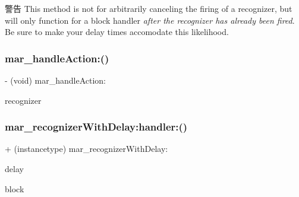 \begin{DoxyWarning}{警告}
This method is not for arbitrarily canceling the firing of a recognizer, but will only function for a block handler {\itshape after the recognizer has already been fired}. Be sure to make your delay times accomodate this likelihood. 
\end{DoxyWarning}
\mbox{\label{category_u_i_gesture_recognizer_07_m_a_r_e_x___block_08_a0b2b9fe2666c4e42cfc2ae11e7ce2221}} 
\subsubsection{\texorpdfstring{mar\+\_\+handle\+Action\+:()}{mar\_handleAction:()}}
{\footnotesize\ttfamily -\/ (void) mar\+\_\+handle\+Action\+: \begin{DoxyParamCaption}\item[{(U\+I\+Gesture\+Recognizer $\ast$)}]{recognizer }\end{DoxyParamCaption}\hspace{0.3cm}{\ttfamily [implementation]}}

\mbox{\label{category_u_i_gesture_recognizer_07_m_a_r_e_x___block_08_a5e3253cef9d5a3acd1f74cc96b421e50}} 
\subsubsection{\texorpdfstring{mar\+\_\+recognizer\+With\+Delay\+:handler\+:()}{mar\_recognizerWithDelay:handler:()}\hspace{0.1cm}{\footnotesize\ttfamily [1/2]}}
{\footnotesize\ttfamily + (instancetype) mar\+\_\+recognizer\+With\+Delay\+: \begin{DoxyParamCaption}\item[{(N\+S\+Time\+Interval)}]{delay }\item[{handler:(void($^\wedge$)(U\+I\+Gesture\+Recognizer $\ast$sender, U\+I\+Gesture\+Recognizer\+State state, C\+G\+Point location))}]{block }\end{DoxyParamCaption}}

